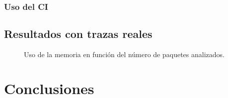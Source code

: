 \documentclass[twoside, 12pt]{epstfg}
\begin{document}
\subsection{Uso del CI}
\section{Resultados con trazas reales}

\begin{figure}[hbtp]
\caption{Uso de la memoria en función del número de paquetes analizados.}
\label{fig:Validacion:DiskStore}
\end{figure}

\chapter{Conclusiones}
\label{chap:Conclusiones}

\backmatter
\appendix

\cleardoublepage

\nocite{*}
{}

\cleardoublepage
\printindex
\end{document}
